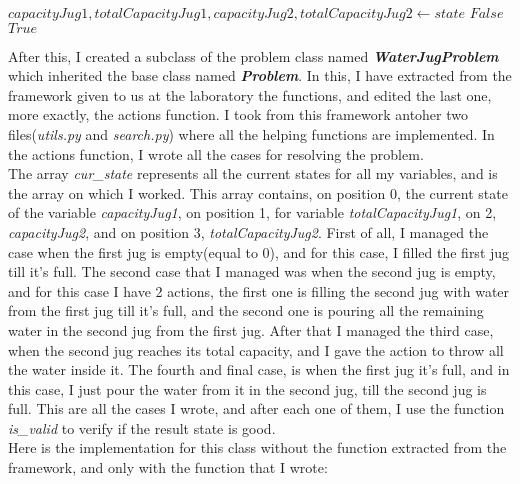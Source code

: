 \documentclass[14pt]{article}
\begin{document}
\vspace{2.5 mm}
\begin{algorithmic}
    \State $capacityJug1, totalCapacityJug1, capacityJug2, totalCapacityJug2\gets state$
        \State \Return $False$
    \EndIf
    \State \Return $True$
\EndFunction
\end{algorithmic}
\vspace{2.5 mm}
After this, I created a subclass of the problem class named \textbf{\textit{WaterJugProblem}} which inherited the base class named \textbf{\textit{Problem}}. In this, I have extracted from the framework given to us at the laboratory the functions, and edited the last one, more exactly, the actions function. I took from this framework antoher two files(\textit{utils.py} and \textit{search.py}) where all the helping functions are implemented. In the actions function, I wrote all the cases for resolving the problem.
\vspace{2.5 mm}
\\The array \textit{cur\_state} represents all the current states for all my variables, and is the array on which I worked. This array contains, on position 0, the current state of the variable \textit{capacityJug1}, on position 1, for variable \textit{totalCapacityJug1}, on 2, \textit{capacityJug2}, and on position 3, \textit{totalCapacityJug2}. First of all, I managed the case when the first jug is empty(equal to 0), and for this case, I filled the first jug till it's full. The second case that I managed was when the second jug is empty, and for this case I have 2 actions, the first one is filling the second jug with water from the first jug till it's full, and the second one is pouring all the remaining water in the second jug from the first jug. After that I managed the third case, when the second jug reaches its total capacity, and I gave the action to throw all the water inside it. The fourth and final case, is when the first jug it's full, and in this case, I just pour the water from it in the second jug, till the second jug is full. This are all the cases I wrote, and after each one of them, I use the function \textit{is\_valid} to verify if the result state is good.
\vspace{2.5 mm}
\\Here is the implementation for this class without the function extracted from the framework, and only with the function that I wrote:
\vspace{2.5 mm}
\end{document}
